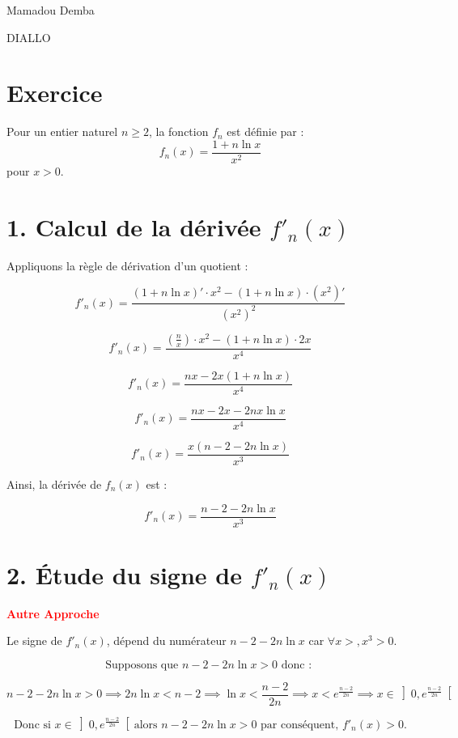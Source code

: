 \documentclass[12pt]{article}
\begin{document}
\begin{minipage}{0.8\textwidth}
    Mamadou Demba                           
\end{minipage}
\begin{minipage}{0.8\textwidth}
   DIALLO                          
\end{minipage}
\section*{Exercice }
Pour un entier naturel \( n \geq 2 \), la fonction \( f_n \) est définie par :
\[ f_n(x) = \frac{1 + n \ln x}{x^2} \]
pour \( x > 0 \).

\section*{1. Calcul de la dérivée \( f'_n(x) \)}
Appliquons la règle de dérivation d'un quotient :

\[ f'_n(x) = \frac{(1 + n \ln x)' \cdot x^2 - (1 + n \ln x) \cdot (x^2)'}{(x^2)^2} \]

\[ f'_n(x) = \frac{\left( \frac{n}{x} \right) \cdot x^2 - (1 + n \ln x) \cdot 2x}{x^4} \]

\[ f'_n(x) = \frac{n x - 2x (1 + n \ln x)}{x^4} \]

\[ f'_n(x) = \frac{nx - 2x - 2nx \ln x}{x^4} \]

\[ f'_n(x) = \frac{x (n - 2 - 2n \ln x)}{x^3} \]

Ainsi, la dérivée de \( f_n(x) \) est :

\[ f'_n(x) = \frac{n - 2 - 2n \ln x}{x^3} \]

\section*{2. Étude du signe de \( f'_n(x) \)}
\begin{center}
	\textbf{\textcolor{red}{Autre Approche}}
\end{center}

Le signe de \( f'_n(x) \), dépend du numérateur \( n - 2 - 2n \ln x \) car \( \forall x>, x^{3}>0 \).

\[\text{Supposons que }  n - 2 - 2n \ln x >0 \text{ donc : }\]

\[ n - 2 - 2n \ln x > 0 \implies 2n \ln x < n - 2 \implies \ln x < \frac{n - 2}{2n} \implies x < e^{\frac{n - 2}{2n}} \implies x\in \left]0,e^{\frac{n - 2}{2n}}\right[ \] 

\[\text{Donc si } x\in \left]0,e^{\frac{n - 2}{2n}}\right[ \text{alors } n - 2 - 2n \ln x >0 \text{ par conséquent, } f'_n(x)>0. \]
\end{document}
